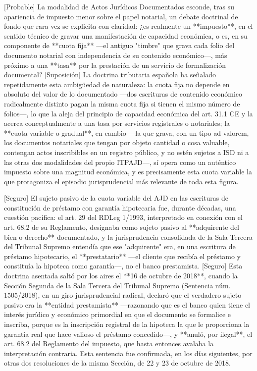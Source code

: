 \documentclass[10pt,a4paper]{article}
\begin{document}
[Probable] La modalidad de Actos Jurídicos Documentados esconde, tras su apariencia de impuesto menor sobre el papel notarial, un debate doctrinal de fondo que rara vez se explicita con claridad: ¿es realmente un **impuesto**, en el sentido técnico de gravar una manifestación de capacidad económica, o es, en su componente de **cuota fija** —el antiguo "timbre" que grava cada folio del documento notarial con independencia de su contenido económico—, más próximo a una **tasa** por la prestación de un servicio de formalización documental? [Suposición] La doctrina tributaria española ha señalado repetidamente esta ambigüedad de naturaleza: la cuota fija no depende en absoluto del valor de lo documentado —dos escrituras de contenido económico radicalmente distinto pagan la misma cuota fija si tienen el mismo número de folios—, lo que la aleja del principio de capacidad económica del art. 31.1 CE y la acerca conceptualmente a una tasa por servicios registrales o notariales; la **cuota variable o gradual**, en cambio —la que grava, con un tipo ad valorem, los documentos notariales que tengan por objeto cantidad o cosa valuable, contengan actos inscribibles en un registro público, y no estén sujetos a ISD ni a las otras dos modalidades del propio ITPAJD—, sí opera como un auténtico impuesto sobre una magnitud económica, y es precisamente esta cuota variable la que protagoniza el episodio jurisprudencial más relevante de toda esta figura.

[Seguro] El sujeto pasivo de la cuota variable del AJD en las escrituras de constitución de préstamo con garantía hipotecaria fue, durante décadas, una cuestión pacífica: el art. 29 del RDLeg 1/1993, interpretado en conexión con el art. 68.2 de su Reglamento, designaba como sujeto pasivo al **adquirente del bien o derecho** documentado, y la jurisprudencia consolidada de la Sala Tercera del Tribunal Supremo entendía que ese "adquirente" era, en una escritura de préstamo hipotecario, el **prestatario** —el cliente que recibía el préstamo y constituía la hipoteca como garantía—, no el banco prestamista. [Seguro] Esta doctrina asentada saltó por los aires el **16 de octubre de 2018**, cuando la Sección Segunda de la Sala Tercera del Tribunal Supremo (Sentencia núm. 1505/2018), en un giro jurisprudencial radical, declaró que el verdadero sujeto pasivo era la **entidad prestamista** —razonando que es el banco quien tiene el interés jurídico y económico primordial en que el documento se formalice e inscriba, porque es la inscripción registral de la hipoteca la que le proporciona la garantía real que hace valioso el préstamo concedido—, y **anuló, por ilegal**, el art. 68.2 del Reglamento del impuesto, que hasta entonces avalaba la interpretación contraria. Esta sentencia fue confirmada, en los días siguientes, por otras dos resoluciones de la misma Sección, de 22 y 23 de octubre de 2018.
\end{document}
